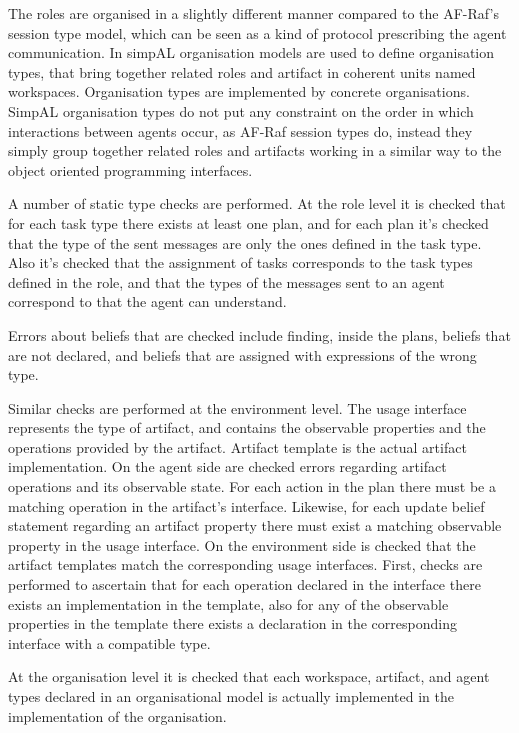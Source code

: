 \documentclass[a4paper,12pt,oneside,fleqn]{book} %
\theoremstyle{plain}
\theoremstyle{definition}
\theoremstyle{remark}
\begin{document}
The roles are organised in a slightly different manner compared to the
AF-Raf's session type model, which can be seen as a kind of protocol
prescribing the agent communication. In simpAL organisation models are used
to define organisation types, that bring together related roles and
artifact in coherent units named workspaces. Organisation types are
implemented by concrete organisations. SimpAL organisation types do not put
any constraint on the order in which interactions between agents occur, as
AF-Raf session types do, instead they simply group together related roles
and artifacts working in a similar way to the object oriented programming
interfaces.

A number of static type checks are performed. At the role level it is
checked that for each task type there exists at least one plan, and for
each plan it's checked that the type of the sent messages are only the ones
defined in the task type. Also it's checked that the assignment of tasks
corresponds to the task types defined in the role, and that the types of
the messages sent to an agent correspond to that the agent can understand. 

Errors about beliefs that are checked include finding, inside the plans,
beliefs that are not declared, and beliefs that are assigned with
expressions of the wrong type.

Similar checks are performed at the environment level. The usage interface
represents the type of artifact, and contains the observable properties and
the operations provided by the artifact. Artifact template is the actual
artifact implementation. On the agent side are checked errors regarding
artifact operations and its observable state. For each action in the plan
there must be a matching operation in the artifact's interface.  Likewise,
for each update belief statement regarding an artifact property there must
exist a matching observable property in the usage interface. On the
environment side is checked that the artifact templates match the
corresponding usage interfaces. First, checks are performed to ascertain
that for each operation declared in the interface there exists an
implementation in the template, also for any of the observable properties
in the template there exists a declaration in the corresponding interface
with a compatible type.

At the organisation level it is checked that each workspace, artifact, and
agent types declared in an organisational model is actually implemented in
the implementation of the organisation. 
\\~\\
\end{document}
